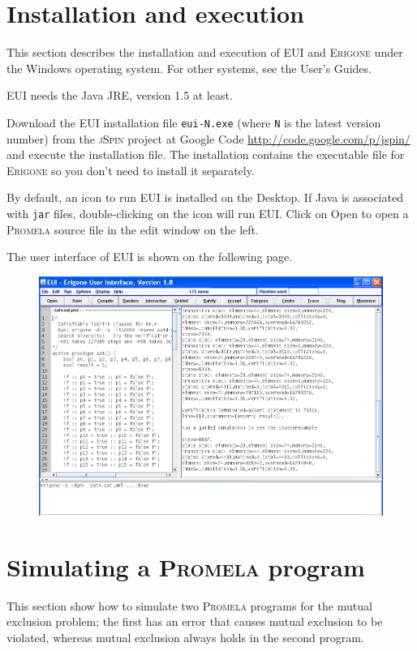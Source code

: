 \documentclass[11pt]{article}
\newcommand*{\prg}{\textsc{Erigone}}
\newcommand*{\eui}{\textsc{EUI}}
\newcommand*{\jsp}{\textsc{jSpin}}
\newcommand*{\prm}{\textsc{Promela}}
\newcommand*{\p}[1]{\texttt{#1}}
\newcommand*{\bu}[1]{\textsf{#1}}
\begin{document}
\section{Installation and execution}

This section describes the installation and execution of \eui{} and \prg{}
under the Windows operating system. For other systems, see the User's Guides.

\eui{} needs the Java JRE, version 1.5 at least. 

Download the \eui{} installation file \p{eui-N.exe} (where \p{N} is the
latest version number) from the \jsp{} project at Google Code
\url{http://code.google.com/p/jspin/} and execute the installation file.
The installation contains the executable file for
\prg{} so you don't need to install it separately.

By default, an icon to run \eui{} is installed on the Desktop. If Java
is associated with \p{jar} files, double-clicking on the icon will run
\eui{}. Click on \bu{Open} to open a \prm{} source file in the edit
window on the left.

The user interface of \eui{} is shown on the following page.

\begin{figure}[tb]
\begin{center}
\includegraphics[width=120mm]{eui}
\end{center}
\end{figure}


\section{Simulating a \prm{} program}

This section show how to simulate two \prm{} programs for the mutual
exclusion problem; the first has an error that causes mutual exclusion
to be violated, whereas mutual exclusion always holds in the second
program.
\end{document}
